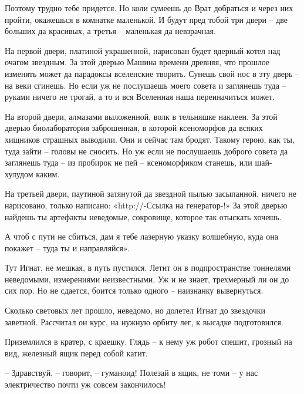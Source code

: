 \documentclass[ebook,oneside,final,openright]{memoir}
\begin{document}
\par
Поэтому трудно тебе придется. Но коли сумеешь до Врат добраться и через них пройти, окажешься в комнатке маленькой. И будут пред тобой три двери – две больших да красивых, а третья – маленькая да невзрачная.\par
\par
На первой двери, платиной украшенной, нарисован будет ядерный котел над очагом звездным. За этой дверью Машина времени древняя, что прошлое изменять может да парадоксы вселенские творить. Сунешь свой нос в эту дверь – на веки сгинешь. Но если уж не послушаешь моего совета и заглянешь туда – руками ничего не трогай, а то и вся Вселенная наша переиначиться может.\par
\par
На второй двери, алмазами выложенной, волк в тельняшке наклеен. За этой дверью биолаборатория заброшенная, в которой ксеноморфов да всяких хищников страшных выводили. Они и сейчас там бродят. Такому герою, как ты, туда зайти – головы не сносить. Но уж если не послушаешь доброго совета да заглянешь туда – из пробирок не пей – ксеноморфиком станешь, или шай-хулудом каким.\par
\par
На третьей двери, паутиной затянутой да звездной пылью засыпанной, ничего не нарисовано, только написано: «http://-Ссылка на генератор-!» За этой дверью найдешь ты артефакты неведомые, сокровище, которое так отыскать хочешь.\par
\par
А чтоб с пути не сбиться, дам я тебе лазерную указку волшебную, куда она покажет – туда ты и направляйся».\par
\par
Тут Игнат, не мешкая, в путь пустился. Летит он в подпространстве тоннелями неведомыми, измерениями неизвестными. Уж и не знает, трехмерный ли он до сих пор. Но не сдается, боится только одного – наизнанку вывернуться.\par
\par
Сколько световых лет прошло, неведомо, но долетел Игнат до звездочки заветной. Рассчитал он курс, на нужную орбиту лег, к высадке подготовился.\par
\par
Приземлился в кратер, с краешку. Глядь – к нему уж робот спешит, грозный на вид, железный ящик перед собой катит.\par
– Здравствуй, – говорит, – гуманоид! Полезай в ящик, не томи – у нас электричество почти уж совсем закончилось!\par
\end{document}
